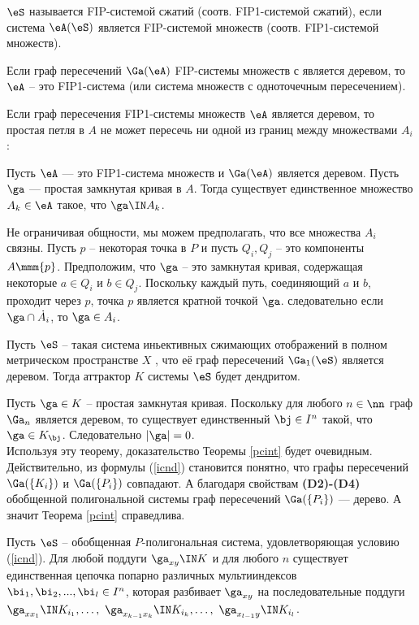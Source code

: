 \begin{definition}\label{fipcs}
 $\eS$ называется FIP-системой сжатий  (соотв. FIP1-системой сжатий), если система $\eA(\eS)$ является FIP-системой множеств (соотв. FIP1-системой множеств).
\end{definition}

Если граф пересечений $\Ga(\eA)$  FIP-системы множеств с является деревом, то $\eA$ -- это FIP1-система (или система множеств с одноточечным пересечением).

Если граф пересечения FIP1-системы множеств  $\eA$ является деревом, то простая петля в $A$ не может пересечь ни одной из границ между множествами $A_i$:

\begin{prop} 
Пусть $\eA$ --- это FIP1-система множеств и $\Ga(\eA)$ является деревом. Пусть $\ga$ --- простая замкнутая кривая в $A$. Тогда существует единственное множество $A_k\in\eA$ такое, что $\ga\IN A_k$.
\end{prop}

\dok Не ограничивая общности, мы можем предполагать, что все множества  $A_i$ связны. Пусть $p$ -- некоторая точка в $P$ и пусть $Q_i,Q_j$ -- это компоненты $A\mmm\{p\}$. Предположим, что $\ga$ -- это замкнутая кривая, содержащая некоторые $a\in Q_i$ и $b\in Q_j$. Поскольку каждый путь, соединяющий $a$ и $b$, проходит через $p$, точка $p$ является кратной точкой $\ga$. следовательно если $\ga\cap  \dot A_i$, то $\ga\in A_i$.\vse

\begin{theorem}
Пусть $\eS$ -- такая система иньективных сжимающих отображений в полном метрическом пространстве $X$ , что её граф пересечений $\Ga_1(\eS)$ является деревом. Тогда аттрактор $K$ системы $\eS$ будет дендритом.
\end{theorem}

\dok Пусть $\ga\in K$ -- простая замкнутая кривая. Поскольку для любого $n\in \nn$ граф $\Ga_n$ является деревом, то существует единственный $\bj\in I^n$ такой, что $\ga\in K_\bj$. Следовательно $|\ga|=0$. \vse\\

Используя эту теорему, доказательство Теоремы \ref{pcint} будет очевидным. Действительно, из формулы (\ref{icnd}) становится понятно, что графы пересечений $\Ga(\{K_i\})$ и $\Ga(\{P_i\})$ совпадают. А благодаря свойствам {\bf (D2)-(D4)} обобщенной полигональной системы граф пересечений $\Ga(\{P_i\})$ --- дерево. А значит  Теорема \ref{pcint} справедлива.

\begin{corollary}
Пусть $\eS$ -- обобщенная $P$-полигональная система, удовлетворяющая условию (\ref{icnd}). Для любой поддуги $\ga_{xy}\IN K$ и для любого $n$ существует единственная цепочка попарно различных мультииндексов $\bi_1,\bi_2,...,\bi_l\in I^n$, которая разбивает $\ga_{xy}$ на последовательные поддуги \\ $\ga_{xx_1}\IN K_{i_1},\ldots,\ \ga_{x_{k-1}x_k}\IN K_{i_k},\ldots,\ \ga_{x_{l-1}y}\IN K_{i_l}$.\vse
\end{corollary}

